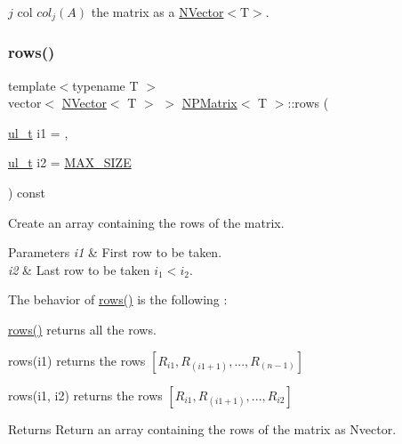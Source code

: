 $ j $ col $col_j(A) $ the matrix as a {\ttfamily \mbox{\hyperlink{class_n_vector}{N\+Vector}}$<$T$>$}. 

\mbox{\label{class_n_p_matrix_add861e9e1df81af2546c3eab1fd40d51}} 
\subsubsection{\texorpdfstring{rows()}{rows()}}
{\footnotesize\ttfamily template$<$typename T $>$ \\
vector$<$ \mbox{\hyperlink{class_n_vector}{N\+Vector}}$<$ T $>$ $>$ \mbox{\hyperlink{class_n_p_matrix}{N\+P\+Matrix}}$<$ T $>$\+::rows (\begin{DoxyParamCaption}\item[{\mbox{\hyperlink{typedef_8h_a1b140a2034db3f5dfe18a987745df43a}{ul\+\_\+t}}}]{i1 = {},  }\item[{\mbox{\hyperlink{typedef_8h_a1b140a2034db3f5dfe18a987745df43a}{ul\+\_\+t}}}]{i2 = {\ttfamily \mbox{\hyperlink{_n_vector_8h_a0592dba56693fad79136250c11e5a7fe}{M\+A\+X\+\_\+\+S\+I\+ZE}}} }\end{DoxyParamCaption}) const}



Create an array containing the rows of the matrix. 


\begin{DoxyParams}{Parameters}
{\em i1} & First row to be taken. \\
\hline
{\em i2} & Last row to be taken $ i_1 \lt i_2 $.\\
\hline
\end{DoxyParams}
The behavior of {\ttfamily \mbox{\hyperlink{class_n_p_matrix_add861e9e1df81af2546c3eab1fd40d51}{rows()}}} is the following \+:
\begin{DoxyItemize}
\item {\ttfamily \mbox{\hyperlink{class_n_p_matrix_add861e9e1df81af2546c3eab1fd40d51}{rows()}}} returns all the rows.
\item {\ttfamily rows(i1)} returns the rows $ [R_{i1}, R_{(i1+1)},..., R_{(n-1)}] $
\item {\ttfamily rows(i1, i2)} returns the rows $ [R_{i1}, R_{(i1+1)},..., R_{i2}] $
\end{DoxyItemize}

\begin{DoxyReturn}{Returns}
Return an array containing the rows of the matrix as {\ttfamily Nvector}. 
\end{DoxyReturn}
\mbox{\label{class_n_p_matrix_a30c8ad7b415fa92a23375cbad3ee8e37}} 
